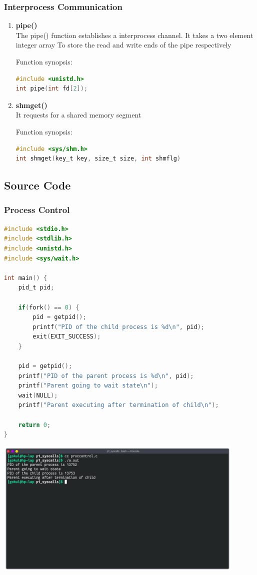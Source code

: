 \subsubsection{Interprocess Communication}
\begin{enumerate}
	\item \textbf{pipe()} \\
	The pipe() function establishes a interprocess channel. It takes a two element integer array To
	store the read and write ends of the pipe respectively

	Function synopsis:
	\begin{lstlisting}[language=C]
#include <unistd.h>
int pipe(int fd[2]);
	\end{lstlisting}

	\item \textbf{shmget()} \\
	It requests for a shared memory segment

	Function synopsis:
	\begin{lstlisting}[language=C]
#include <sys/shm.h>
int shmget(key_t key, size_t size, int shmflg)
	\end{lstlisting}
\end{enumerate}


\subsection{Source Code}
\subsubsection{Process Control}
\begin{lstlisting}[language=C]
#include <stdio.h>
#include <stdlib.h>
#include <unistd.h>
#include <sys/wait.h>

int main() {
	pid_t pid;

	if(fork() == 0) {
		pid = getpid();
		printf("PID of the child process is %d\n", pid);
		exit(EXIT_SUCCESS);
	} 

	pid = getpid();
	printf("PID of the parent process is %d\n", pid);
	printf("Parent going to wait state\n");
	wait(NULL);
	printf("Parent executing after termination of child\n");

	return 0;
}
\end{lstlisting}

\begin{center}
	\includegraphics[width=0.90\textwidth]{img/p2/ss1.png}
\end{center}

